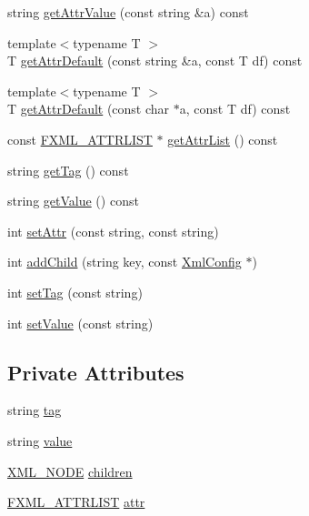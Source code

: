 \begin{DoxyCompactItemize}
\item 
string \mbox{\hyperlink{classgraphsat_1_1_xml_config_a6f5d856d63643bcaa71589985331d1ad}{get\+Attr\+Value}} (const string \&a) const
\item 
{\footnotesize template$<$typename T $>$ }\\T \mbox{\hyperlink{classgraphsat_1_1_xml_config_a1b5a27e8192652ba81540aa9d167438c}{get\+Attr\+Default}} (const string \&a, const T df) const
\item 
{\footnotesize template$<$typename T $>$ }\\T \mbox{\hyperlink{classgraphsat_1_1_xml_config_ac3a3bba85e42c9412494735ef25ca027}{get\+Attr\+Default}} (const char $\ast$a, const T df) const
\item 
const \mbox{\hyperlink{namespacegraphsat_ab40f1a7cacbf704e1869c944a7893ccc}{F\+X\+M\+L\+\_\+\+A\+T\+T\+R\+L\+I\+ST}} $\ast$ \mbox{\hyperlink{classgraphsat_1_1_xml_config_a402172ca141ffd7b4ab7c24630a3ec0b}{get\+Attr\+List}} () const
\item 
string \mbox{\hyperlink{classgraphsat_1_1_xml_config_ad73db8940c92561b9ed0dc3758686f7b}{get\+Tag}} () const
\item 
string \mbox{\hyperlink{classgraphsat_1_1_xml_config_ae8f15789e71f2bb0f795b832b107698f}{get\+Value}} () const
\item 
int \mbox{\hyperlink{classgraphsat_1_1_xml_config_a1405c11dfe812f779d97523937c83f2d}{set\+Attr}} (const string, const string)
\item 
int \mbox{\hyperlink{classgraphsat_1_1_xml_config_a41c147d6ae9b486a591f94a24f40cd92}{add\+Child}} (string key, const \mbox{\hyperlink{classgraphsat_1_1_xml_config}{Xml\+Config}} $\ast$)
\item 
int \mbox{\hyperlink{classgraphsat_1_1_xml_config_af2247871edf1a0b47fd32574e0c0396f}{set\+Tag}} (const string)
\item 
int \mbox{\hyperlink{classgraphsat_1_1_xml_config_a31da54b1b966dd9085ecfa645927b48a}{set\+Value}} (const string)
\end{DoxyCompactItemize}
\subsection*{Private Attributes}
\begin{DoxyCompactItemize}
\item 
string \mbox{\hyperlink{classgraphsat_1_1_xml_config_ad8934796a716290b436bd57f1040a172}{tag}}
\item 
string \mbox{\hyperlink{classgraphsat_1_1_xml_config_ac0ce9971b7a1a09321f3da6674c304bb}{value}}
\item 
\mbox{\hyperlink{namespacegraphsat_a8b991d53e7169027cb0197e267a5915b}{X\+M\+L\+\_\+\+N\+O\+DE}} \mbox{\hyperlink{classgraphsat_1_1_xml_config_a537e38aff89cbe457425bae484885faa}{children}}
\item 
\mbox{\hyperlink{namespacegraphsat_ab40f1a7cacbf704e1869c944a7893ccc}{F\+X\+M\+L\+\_\+\+A\+T\+T\+R\+L\+I\+ST}} \mbox{\hyperlink{classgraphsat_1_1_xml_config_a27f0a423b0d17769c5b6a0e5fdbde649}{attr}}
\end{DoxyCompactItemize}


